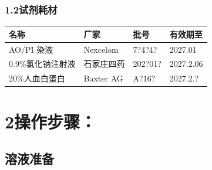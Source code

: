 \documentclass[UTF8,10pt,a4paper,fontset=fandol]{ctexart}
\newcommand{\fieldvalue}[1]{#1}
\newcommand{\handwritten}[1]{#1}
\begin{document}
\subsubsection*{1.2\quad 试剂耗材}

\begin{center}
\begin{tabular}{|p{3.2cm}|p{3.0cm}|p{4.0cm}|p{3.0cm}|}
\hline
名称 & 厂家 & 批号 & 有效期至 \\
\hline
\fieldvalue{AO/PI 染液} &
\fieldvalue{Nexcelom} &
\fieldvalue{\handwritten{7?4?4?}} &
\fieldvalue{\handwritten{2027.01}}
\\
\hline
\fieldvalue{0.9\%氯化钠注射液} &
\fieldvalue{石家庄四药} &
\fieldvalue{\handwritten{202?01?}} &
\fieldvalue{\handwritten{2027.2.06}}
\\
\hline
\fieldvalue{20\%人血白蛋白} &
\fieldvalue{Baxter AG} &
\fieldvalue{\handwritten{A?16?}} &
\fieldvalue{\handwritten{2027.2.?}}
\\
\hline
\end{tabular}
\end{center}

\section*{2\quad 操作步骤：}

\subsection*{溶液准备}
\end{document}
